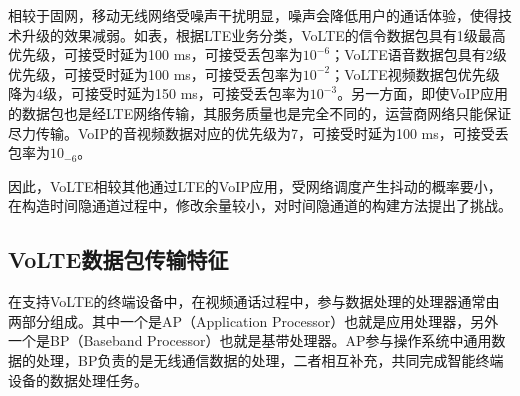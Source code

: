 
相较于固网，移动无线网络受噪声干扰明显，噪声会降低用户的通话体验，使得技术升级的效果减弱。如表，根据LTE业务分类，VoLTE的信令数据包具有1级最高优先级，可接受时延为100 ms，可接受丢包率为$10^{-6}$；VoLTE语音数据包具有2级优先级，可接受时延为100 ms，可接受丢包率为$10^{-2}$；VoLTE视频数据包优先级降为4级，可接受时延为150 ms，可接受丢包率为$10^{-3}$。另一方面，即使VoIP应用的数据包也是经LTE网络传输，其服务质量也是完全不同的，运营商网络只能保证尽力传输。VoIP的音视频数据对应的优先级为7，可接受时延为100 ms，可接受丢包率为$10_{-6}$。

因此，VoLTE相较其他通过LTE的VoIP应用，受网络调度产生抖动的概率要小，在构造时间隐通道过程中，修改余量较小，对时间隐通道的构建方法提出了挑战。

\subsection{VoLTE数据包传输特征}
\label{chap:backinfo:volte:packets}
在支持VoLTE的终端设备中，在视频通话过程中，参与数据处理的处理器通常由两部分组成。其中一个是AP（Application Processor）也就是应用处理器，另外一个是BP（Baseband Processor）也就是基带处理器。AP参与操作系统中通用数据的处理，BP负责的是无线通信数据的处理，二者相互补充，共同完成智能终端设备的数据处理任务。

